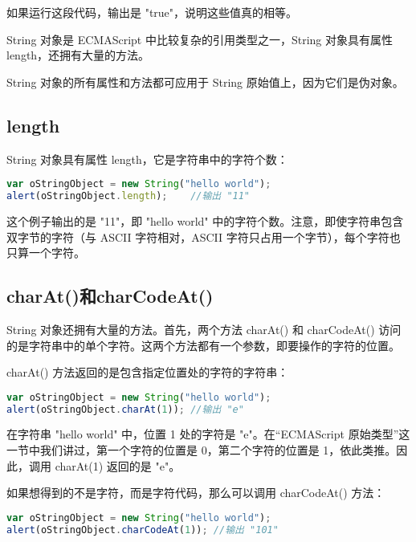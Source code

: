 如果运行这段代码，输出是 "true"，说明这些值真的相等。




String 对象是 ECMAScript 中比较复杂的引用类型之一，String 对象具有属性 length，还拥有大量的方法。

String 对象的所有属性和方法都可应用于 String 原始值上，因为它们是伪对象。




\subsection{length}

String 对象具有属性 length，它是字符串中的字符个数：


\begin{lstlisting}[language=JavaScript]
var oStringObject = new String("hello world");
alert(oStringObject.length);	//输出 "11"
\end{lstlisting}

这个例子输出的是 "11"，即 "hello world" 中的字符个数。注意，即使字符串包含双字节的字符（与 ASCII 字符相对，ASCII 字符只占用一个字节），每个字符也只算一个字符。

\subsection{charAt()和charCodeAt()}

String 对象还拥有大量的方法。首先，两个方法 charAt() 和 charCodeAt() 访问的是字符串中的单个字符。这两个方法都有一个参数，即要操作的字符的位置。

charAt() 方法返回的是包含指定位置处的字符的字符串：


\begin{lstlisting}[language=JavaScript]
var oStringObject = new String("hello world");
alert(oStringObject.charAt(1));	//输出 "e"
\end{lstlisting}

在字符串 "hello world" 中，位置 1 处的字符是 "e"。在“ECMAScript 原始类型”这一节中我们讲过，第一个字符的位置是 0，第二个字符的位置是 1，依此类推。因此，调用 charAt(1) 返回的是 "e"。

如果想得到的不是字符，而是字符代码，那么可以调用 charCodeAt() 方法：

\begin{lstlisting}[language=JavaScript]
var oStringObject = new String("hello world");
alert(oStringObject.charCodeAt(1));	//输出 "101"
\end{lstlisting}

